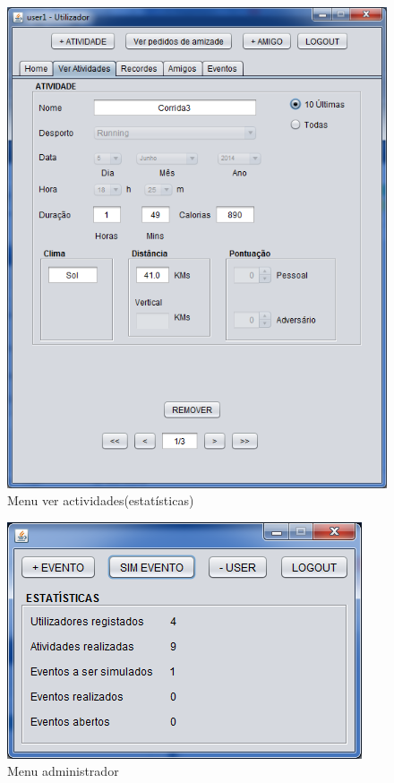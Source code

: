 \documentclass[12pt,notitlepage]{article}
\begin{document}
\begin{figure}[h]
\centering
\includegraphics[scale=1]{verActividades.png}
\caption{Menu ver actividades(estatísticas)}
\end{figure}



\begin{figure}[h]
\centering
\includegraphics[scale=1]{admin.png}
\caption{Menu administrador}
\end{figure}
\end{document}
